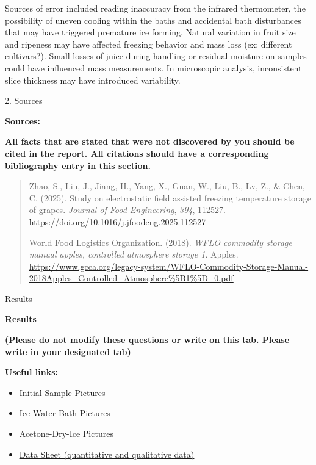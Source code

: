 Sources of error included reading inaccuracy from the infrared
thermometer, the possibility of uneven cooling within the baths and
accidental bath disturbances that may have triggered premature ice
forming. Natural variation in fruit size and ripeness may have affected
freezing behavior and mass loss (ex: different cultivars?). Small losses
of juice during handling or residual moisture on samples could have
influenced mass measurements. In microscopic analysis, inconsistent
slice thickness may have introduced variability.

2. Sources

\textbf{Sources:\\
}

\textbf{All facts that are stated that were not discovered by you should
be cited in the report. All citations should have a corresponding
bibliography entry in this section.}

\begin{quote}
Zhao, S., Liu, J., Jiang, H., Yang, X., Guan, W., Liu, B., Lv, Z., \&
Chen, C. (2025). Study on electrostatic field assisted freezing
temperature storage of grapes. \emph{Journal of Food Engineering},
\emph{394}, 112527.
\href{https://doi.org/10.1016/j.jfoodeng.2025.112527}{\ul{https://doi.org/10.1016/j.jfoodeng.2025.112527}}

World Food Logistics Organization. (2018). \emph{WFLO commodity storage
manual apples, controlled atmosphere storage 1}. Apples.
\href{https://www.gcca.org/legacy-system/WFLO-Commodity-Storage-Manual-2018Apples_Controlled_Atmosphere\%5B1\%5D_0.pdf}{\ul{https://www.gcca.org/legacy-system/WFLO-Commodity-Storage-Manual-2018Apples\_Controlled\_Atmosphere\%5B1\%5D\_0.pdf}}
\end{quote}

Results

\textbf{Results}

\textbf{(Please do not modify these questions or write on this tab.
Please write in your designated tab)}

\textbf{Useful links:}

\begin{itemize}
\item
  \href{https://drive.google.com/drive/folders/1HfUY64YCwoHetagSDpJOahoH-zSswrbs?usp=drive_link}{\ul{Initial
  Sample Pictures}}
\item
  \href{https://drive.google.com/drive/folders/1YSVa-CDu4g39CmCwvr0QcoKk0oyX-Gw9?usp=drive_link}{\ul{Ice-Water
  Bath Pictures}}
\item
  \href{https://drive.google.com/drive/folders/1hbAqyZgXMqdLH1_UBrjk5hroIpjT1320?usp=drive_link}{\ul{Acetone-Dry-Ice
  Pictures}}
\item
  \href{https://drive.google.com/drive/folders/1ZHALieRmtOkKvx9nMNw6_dSi68EbCrts?usp=drive_link}{\ul{Data
  Sheet (quantitative and qualitative data)}}
\end{itemize}


